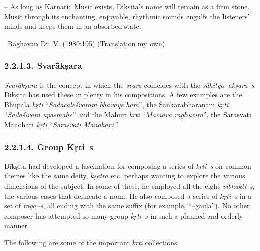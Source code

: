 \begin{myquote}
– As long as Karnatic Music exists, Dīkṣita’s name will remain as a firm stone. Music through its enchanting, enjoyable, rhythmic sounds engulfs the listeners’ minds and keeps them in an absorbed state. 

~\hfill Raghavan Dr. V. (1980:195) (Translation my own)
\end{myquote}


\subsubsection*{2.2.1.3. Svarākṣara}

\textit{Svarākṣara} is the concept in which the \textit{svara} coincides with the \textit{sāhitya–akṣara–s}. Dīkṣita has used these in plenty in his compositions. A few examples are the Bhūpāla \textit{kṛti} “\textit{Sadācaleśvaraṁ bhāvaye’ham}”, the Śaṅkarābharaṇam \textit{kṛti} “\textit{Sadāśivam upāsmahe}” and the Māhurī \textit{kṛti} “\textit{Māmava raghuvīra}”, the Sarasvati Manohari \textit{kṛti} “\textit{Sarasvati Manohari”.}


\subsubsection*{2.2.1.4. Group Kṛti–s}

Dīkṣita had developed a fascination for composing a series of \textit{kṛti–s} on common themes like the same deity, \textit{kṣetra} etc, perhaps wanting to explore the various dimensions of the subject. In some of these, he employed all the eight \textit{vibhakti–s}, the various cases that delineate a noun. He also composed a series of \textit{kṛti–s} in a set of \textit{rāga–s}, all ending with the same suffix (for example, “–gauḷa”). No other composer has attempted so many group \textit{kṛti–s} in such a planned and orderly manner.

The following are some of the important \textit{kṛti} collections:

